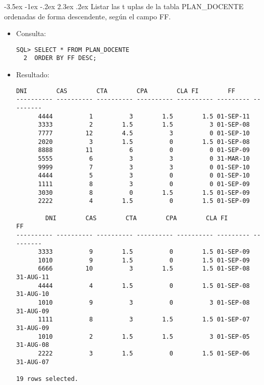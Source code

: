 \documentclass[11pt]{report}
\makeatletter
\renewcommand\chapter{\@startsection{chapter}{0}{\z@}%
    {-3.5ex \@plus -1ex \@minus -.2ex}%
    {2.3ex \@plus.2ex}%
    {\normalfont\Large\bfseries}}
\makeatother
\begin{document}
\chapter{Listar las t uplas de la tabla PLAN\_DOCENTE ordenadas de forma descendente, según el campo FF.}
\begin{itemize}
  \item Consulta:
  \begin{verbatim}
SQL> SELECT * FROM PLAN_DOCENTE
  2  ORDER BY FF DESC;
  \end{verbatim}
  \item{Resultado:}
  \begin{verbatim}
DNI        CAS        CTA        CPA        CLA FI        FF             
---------- ---------- ---------- ---------- ---------- --------- ---------      
      4444          1          3        1.5        1.5 01-SEP-11                
      3333          2        1.5        1.5          3 01-SEP-08                
      7777         12        4.5          3          0 01-SEP-10                
      2020          3        1.5          0        1.5 01-SEP-08                
      8888         11          6          0          0 01-SEP-09                
      5555          6          3          3          0 31-MAR-10                
      9999          7          3          3          0 01-SEP-10                
      4444          5          3          0          0 01-SEP-10                
      1111          8          3          0          0 01-SEP-09                
      3030          8          0        1.5        1.5 01-SEP-09                
      2222          4        1.5          0        1.5 01-SEP-09                

        DNI        CAS        CTA        CPA        CLA FI        FF             
---------- ---------- ---------- ---------- ---------- --------- ---------      
      3333          9        1.5          0        1.5 01-SEP-09                
      1010          9        1.5          0        1.5 01-SEP-09                
      6666         10          3        1.5        1.5 01-SEP-08 31-AUG-11      
      4444          4        1.5          0        1.5 01-SEP-08 31-AUG-10      
      1010          9          3          0          3 01-SEP-08 31-AUG-09      
      1111          8          3        1.5        1.5 01-SEP-07 31-AUG-09      
      1010          2        1.5        1.5          3 01-SEP-05 31-AUG-08      
      2222          3        1.5          0        1.5 01-SEP-06 31-AUG-07      

19 rows selected.
  \end{verbatim}
\end{itemize}
\end{document}
